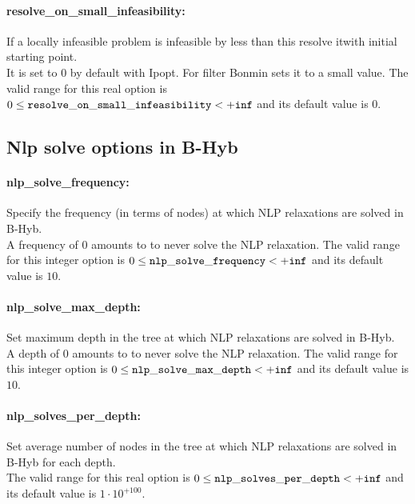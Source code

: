 \paragraph{\bf resolve\_on\_small\_infeasibility:}\label{sec:resolve_on_small_infeasibility} If a locally infeasible problem is infeasible by less than this resolve itwith initial starting point. $\;$ \\
 It is set to 0 by default with Ipopt. For filter
Bonmin sets it to a small value. The valid range for this real option is 
$0 \le {\tt resolve\_on\_small\_infeasibility } <  {\tt +inf}$
and its default value is $0$.


\subsection{Nlp solve options in B-Hyb}
\label{sec:Nlp_solve_options_in_B-Hyb}
\paragraph{\bf nlp\_solve\_frequency:}\label{sec:nlp_solve_frequency} Specify the frequency (in terms of nodes) at which NLP relaxations are solved in B-Hyb. $\;$ \\
 A frequency of 0 amounts to to never solve the
NLP relaxation. The valid range for this integer option is
$0 \le {\tt nlp\_solve\_frequency } <  {\tt +inf}$
and its default value is $10$.


\paragraph{\bf nlp\_solve\_max\_depth:}\label{sec:nlp_solve_max_depth} Set maximum depth in the tree at which NLP relaxations are solved in B-Hyb. $\;$ \\
 A depth of 0 amounts to to never solve the NLP
relaxation. The valid range for this integer option is
$0 \le {\tt nlp\_solve\_max\_depth } <  {\tt +inf}$
and its default value is $10$.


\paragraph{\bf nlp\_solves\_per\_depth:}\label{sec:nlp_solves_per_depth} Set average number of nodes in the tree at which NLP relaxations are solved in B-Hyb for each depth. $\;$ \\
 The valid range for this real option is 
$0 \le {\tt nlp\_solves\_per\_depth } <  {\tt +inf}$
and its default value is $1 \cdot 10^{+100}$.



